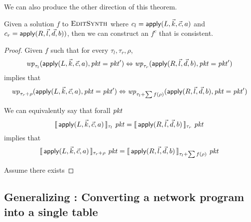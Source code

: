 We can also produce the other direction of this theorem.

\begin{theorem}
  Given a solution $f$ to $\textsc{EditSynth}$ where
  $c_l = \mathsf{apply}(L, \vec k, \vec c, a)$ and
  $c_r = \mathsf{apply}(R,\vec l, \vec d, b))$, then we can construct an $f^c$
  that is consistent.
\end{theorem}

\begin{proof}
  Given $f$ such that for every $\tau_l, \tau_r, \rho$,
  \[\mathit{wp}_{\tau_l}(\mathsf{apply}(L, \vec k, \vec c, a), \mathit{pkt} = \mathit{pkt}') \Leftrightarrow
    \mathit{wp}_{\tau_r}( \mathsf{apply}(R,\vec l, \vec d, b), \mathit{pkt} = \mathit{pkt}')\]
  implies that
  \[\mathit{wp}_{\tau_r + \rho}(\mathsf{apply}(L, \vec k, \vec c, a), \mathit{pkt} = \mathit{pkt}') \Leftrightarrow
    \mathit{wp}_{\tau_l + \sum f(\rho)}(\mathsf{apply}(R,\vec l, \vec d, b), \mathit{pkt} = \mathit{pkt}')\]

  We can equivalently say that forall $\mathit{pkt}$
    \[\llbracket\,\mathsf{apply}(L, \vec k, \vec c, a)\,\rrbracket_{\tau_l}~\mathit{pkt} =
    \llbracket\,\mathsf{apply}(R,\vec l, \vec d, b)\,\rrbracket_{\tau_r}~\mathit{pkt}\]
  implies that
  \[\llbracket\,\mathsf{apply}(L, \vec k, \vec c, a)\,\rrbracket_{\tau_r + \rho}~\mathit{pkt} =
    \llbracket\,\mathsf{apply}(R,\vec l, \vec d, b)\,\rrbracket_{\tau_l + \sum f(\rho)}~\mathit{pkt}\]

  Assume there exists

\end{proof}




\subsection{Generalizing : Converting a network program into a single table}

